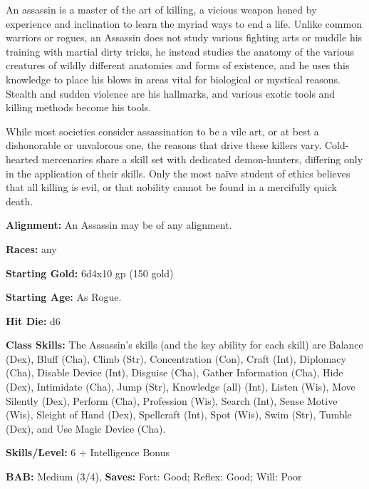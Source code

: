 
An assassin is a master of the art of killing, a vicious weapon honed by experience and inclination to learn the myriad ways to end a life. Unlike common warriors or rogues, an Assassin does not study various fighting arts or muddle his training with martial dirty tricks, he instead studies the anatomy of the various creatures of wildly different anatomies and forms of existence, and he uses this knowledge to place his blows in areas vital for biological or mystical reasons. Stealth and sudden violence are his hallmarks, and various exotic tools and killing methods become his tools.

While most societies consider assassination to be a vile art, or at best a dishonorable or unvalorous one, the reasons that drive these killers vary. Cold-hearted mercenaries share a skill set with dedicated demon-hunters, differing only in the application of their skills. Only the most naïve student of ethics believes that all killing is evil, or that nobility cannot be found in a mercifully quick death.

\textbf{Alignment:} An Assassin may be of any alignment.

\textbf{Races:} any

\textbf{Starting Gold:} 6d4x10 gp (150 gold)

\textbf{Starting Age:} As Rogue.

\textbf{Hit Die:} d6

\textbf{Class Skills:} The Assassin's skills (and the key ability for each skill) are Balance (Dex), Bluff (Cha), Climb (Str), Concentration (Con), Craft (Int), Diplomacy (Cha), Disable Device (Int), Disguise (Cha), Gather Information (Cha), Hide (Dex), Intimidate (Cha), Jump (Str), Knowledge (all) (Int), Listen (Wis), Move Silently (Dex), Perform (Cha), Profession (Wis), Search (Int), Sense Motive (Wis), Sleight of Hand (Dex), Spellcraft (Int), Spot (Wis), Swim (Str), Tumble (Dex), and Use Magic Device (Cha).

\textbf{Skills/Level:} 6 + Intelligence Bonus

\textbf{BAB:} Medium (3/4), \textbf{Saves:} Fort: Good; Reflex: Good; Will: Poor

\modebab{}
\goodfor{}
\goodref{}
\poorwil{}

